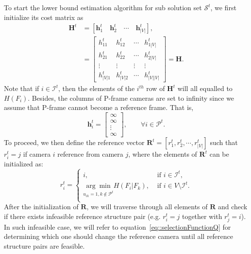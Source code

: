 To start the lower bound estimation algorithm for sub solution set $\mathcal{S}^t$, we first initialize its cost matrix as
\begin{align}
\mathbf{H}^t
&= \left[ \mathbf{h}_1^t \quad \mathbf{h}_2^t \quad \cdots \quad \mathbf{h}_{|V|}^t \right], \nonumber \\
&= \left[ \begin{array}{cccc}
h_{11}^t &h_{12}^t &\cdots &h_{1|V|}^t \\
h_{21}^t &h_{22}^t &\cdots &h_{2|V|}^t \\
\vdots &\vdots &\vdots &\vdots \\
h_{|V|1}^t &h_{|V|2}^t &\cdots &h_{|V||V|}^t
\end{array} \right]
= \mathbf{H}.
\label{eq::modBBcostMatrix}
\end{align}
Note that if $i \in \mathcal{I}^t$, then the elements of the $i^{th}$ row of $\mathbf{H}^t$ will all equalled to $H(F_i)$.
Besides, the columns of P-frame cameras are set to infinity since we assume that P-frame cannot become a reference frame.
That is,
\begin{equation}
\mathbf{h}^t_i = \left[ \begin{array}{c}
\infty \\
\infty \\
\vdots \\
\infty
\end{array} \right],
\quad \quad \forall i \in \mathcal{P}^t.
\label{eq::infColumn}
\end{equation}
To proceed, we then define the reference vector ${\mathbf{R}^t = [r_1^t,r_2^t,\cdots,r_{|V|}^t]}$ such that $r_i^t = j$ if camera $i$ reference from camera $j$, where the elements of $\mathbf{R}^t$ can be initialized as:
\begin{equation}
r_i^t = 
\left\{ \begin{array}{cc}
i,  &\text{ if $i \in \mathcal{I}^t$,} \\                  	   
\underset{u_{ik}=1, k \notin \mathcal{P}^t}{\arg\min} H(F_i|F_k),  &\text{ if $i \in V\setminus \mathcal{I}^t$.} \\
\end{array} \right.
\label{eq::initRefStructure}
\end{equation}
After the initialization of $\mathbf{R}$, we will traverse through all elements of $\mathbf{R}$ and check if there exists infeasible reference structure pair (e.g. $r_i^t = j$ together with $r_j^t=i$).
In such infeasible case, we will refer to equation~\eqref{eq::selectionFunctionQ} for determining which one should change the reference camera until all reference structure pairs are feasible.
